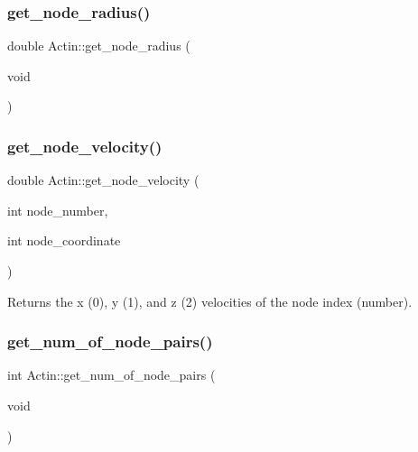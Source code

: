 \mbox{\label{classActin_a4180755ec60e5d39f7399f80270bed1d}} 
\subsubsection{\texorpdfstring{get\_node\_radius()}{get\_node\_radius()}}
{\footnotesize\ttfamily double Actin\+::get\+\_\+node\+\_\+radius (\begin{DoxyParamCaption}\item[{void}]{ }\end{DoxyParamCaption})\hspace{0.3cm}{\ttfamily [inline]}}

\mbox{\label{classActin_ad1367a39ec6362c503d5c21b9d96d58b}} 
\subsubsection{\texorpdfstring{get\_node\_velocity()}{get\_node\_velocity()}}
{\footnotesize\ttfamily double Actin\+::get\+\_\+node\+\_\+velocity (\begin{DoxyParamCaption}\item[{int}]{node\+\_\+number,  }\item[{int}]{node\+\_\+coordinate }\end{DoxyParamCaption})\hspace{0.3cm}{\ttfamily [inline]}}

Returns the x (0), y (1), and z (2) velocities of the node index (number). \mbox{\label{classActin_aab2351fd842efa6127dda490cb1cdbd3}} 
\subsubsection{\texorpdfstring{get\_num\_of\_node\_pairs()}{get\_num\_of\_node\_pairs()}}
{\footnotesize\ttfamily int Actin\+::get\+\_\+num\+\_\+of\+\_\+node\+\_\+pairs (\begin{DoxyParamCaption}\item[{void}]{ }\end{DoxyParamCaption})\hspace{0.3cm}{\ttfamily [inline]}}

